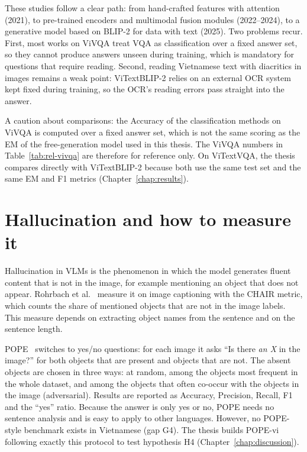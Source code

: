 These studies follow a clear path: from hand-crafted features with attention (2021), to
pre-trained encoders and multimodal fusion modules (2022--2024), to a generative model
based on BLIP-2 for data with text (2025). Two problems recur. First, most works on
ViVQA treat VQA as classification over a fixed answer set, so they cannot produce
answers unseen during training, which is mandatory for questions that require reading.
Second, reading Vietnamese text with diacritics in images remains a weak point:
ViTextBLIP-2 relies on an external OCR system kept fixed during training, so the OCR's
reading errors pass straight into the answer.

A caution about comparisons: the Accuracy of the classification methods on ViVQA is
computed over a fixed answer set, which is not the same scoring as the EM of the
free-generation model used in this thesis. The ViVQA numbers in
Table~\ref{tab:rel-vivqa} are therefore for reference only. On ViTextVQA, the thesis
compares directly with ViTextBLIP-2 because both use the same test set and the same EM
and F1 metrics (Chapter~\ref{chap:results}).

\section{Hallucination and how to measure it}
\label{sec:rel-halluc}

Hallucination in VLMs is the phenomenon in which the model generates fluent content
that is not in the image, for example mentioning an object that does not appear.
Rohrbach et al.~\cite{rohrbach2018chair} measure it on image captioning with the CHAIR
metric, which counts the share of mentioned objects that are not in the image labels.
This measure depends on extracting object names from the sentence and on the sentence
length.

POPE~\cite{li2023pope} switches to yes/no questions: for each image it asks ``Is there
\emph{an X} in the image?'' for both objects that are present and objects that are not.
The absent objects are chosen in three ways: at random, among the objects most frequent
in the whole dataset, and among the objects that often co-occur with the objects in the
image (adversarial). Results are reported as Accuracy, Precision, Recall, F1 and the
``yes'' ratio. Because the answer is only yes or no, POPE needs no sentence analysis and
is easy to apply to other languages. However, no POPE-style benchmark exists in
Vietnamese (gap G4). The thesis builds POPE-vi following exactly this protocol to test
hypothesis H4 (Chapter~\ref{chap:discussion}).

